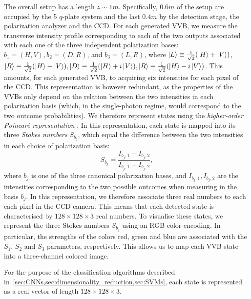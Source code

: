 \documentclass[
    floatfix, aps, pra, superscriptaddress,
	10pt, twocolumn,
    nofootinbib,
	tightenlines
]{revtex4-1}
\newcommand{\redComm}[1]{\textcolor{red}{\small[#1]}}
\begin{document}
The overall setup has a length $z\sim 1 \si{m}$. Specifically, $0.6 \si{m}$ of the setup are occupied by the 5 $q$-plate system and the last $0.4 \si{m}$ by the detection stage, the polarization analyzer and the CCD.
For each generated \ac{VVB}, we measure the transverse intensity profile corresponding to each of the two outputs associated with each one of the three independent polarization bases: $b_1=(H,V), b_2=(D,R)$, and $b_3=(L,R)$, where $\ket L\equiv \frac{1}{\sqrt2}(\ket H + \ket V)$, $\ket R\equiv \frac{1}{\sqrt2}(\ket H - \ket V), \ket D\equiv \frac{1}{\sqrt2}(\ket H + i \ket V), \ket R\equiv \frac{1}{\sqrt2}(\ket H - i \ket V)$.
This amounts, for each generated \ac{VVB}, to acquiring six intensities for each pixel of the \ac{CCD}. This representation is however redundant, as the properties of the VVBs only depend on the relation between the two intensities in each polarization basis (which, in the single-photon regime, would correspond to the two outcome probabilities).
We therefore represent states using the \emph{higher-order Poincar\'e representation} \cite{milione_poinc_sphere_2011,Cardano:12}. In this representation, each state is mapped into its three \emph{Stokes numbers} $S_{b_j}$, which equal the difference between the two intensities in each choice of polarization basis:
\begin{equation}
    S_{b_j} = \frac{I_{b_j,1} - I_{b_j,2}}{I_{b_j,1} + I_{b_j,2}},
\end{equation}
where $b_j$ is one of the three canonical polarization bases, and $I_{b_j,1}, I_{b_j,2}$ are the intensities corresponding to the two possible outcomes when measuring in the basis $b_j$.
In this representation, we therefore associate three real numbers to each each pixel in the CCD camera. This means that each detected state is characterised by $128\times128\times3$ real numbers. To visualise these states, we represent the three Stokes numbers $S_{b_j}$ using an RGB color encoding. In particular, the strengths of the colors red, green and blue are associated with the $S_{1}$, $S_{2}$ and $S_{3}$ parameters,  respectively.  %
This allows us to map each VVB state into a three-channel colored image.

For the purpose of the classification algorithms described in~\cref{sec:CNNs,sec:dimensionality_reduction,sec:SVMs}, each state is represented as a real vector of length $128\times128\times 3$.

\end{document}
